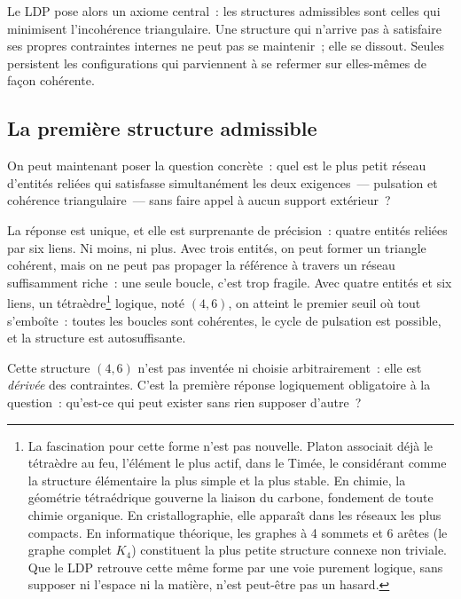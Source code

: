 \documentclass[12pt, a4paper, openright]{book}
\begin{document}
\medskip

Le LDP pose alors un axiome central~: les structures admissibles sont celles qui minimisent l'incohérence triangulaire. Une structure qui n'arrive pas à satisfaire ses propres contraintes internes ne peut pas se maintenir~; elle se dissout. Seules persistent les configurations qui parviennent à se refermer sur elles-mêmes de façon cohérente.

\subsection*{La première structure admissible}

On peut maintenant poser la question concrète~: quel est le plus petit réseau d'entités reliées qui satisfasse simultanément les deux exigences~--- pulsation et cohérence triangulaire~--- sans faire appel à aucun support extérieur~?

\medskip

La réponse est unique, et elle est surprenante de précision~: quatre entités reliées par six liens. Ni moins, ni plus. Avec trois entités, on peut former un triangle cohérent, mais on ne peut pas propager la référence à travers un réseau suffisamment riche~: une seule boucle, c'est trop fragile. Avec quatre entités et six liens, un tétraèdre\footnote{La fascination pour cette forme n'est pas nouvelle. Platon associait déjà le tétraèdre au feu, l'élément le plus actif, dans le Timée, le considérant comme la structure élémentaire la plus simple et la plus stable. En chimie, la géométrie tétraédrique gouverne la liaison du carbone, fondement de toute chimie organique. En cristallographie, elle apparaît dans les réseaux les plus compacts. En informatique théorique, les graphes à 4 sommets et 6 arêtes (le graphe complet $K_4$) constituent la plus petite structure connexe non triviale. Que le LDP retrouve cette même forme par une voie purement logique, sans supposer ni l'espace ni la matière, n'est peut-être pas un hasard.} logique, noté $(4,6)$, on atteint le premier seuil où tout s'emboîte~: toutes les boucles sont cohérentes, le cycle de pulsation est possible, et la structure est autosuffisante.

\medskip

Cette structure $(4,6)$ n'est pas inventée ni choisie arbitrairement~: elle est \emph{dérivée} des contraintes. C'est la première réponse logiquement obligatoire à la question~: qu'est-ce qui peut exister sans rien supposer d'autre~?

\medskip
\end{document}
